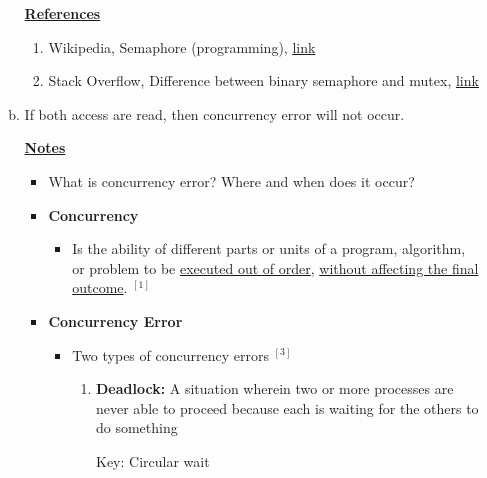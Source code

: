 \documentclass[12pt]{article}
\begin{document}
\begin{enumerate}[1.]
\begin{enumerate}[a)]
        \underline{\textbf{References}}

        \begin{enumerate}[1)]
            \item Wikipedia, Semaphore (programming), \href{https://en.wikipedia.org/wiki/Semaphore_(programming)}{link}
            \item Stack Overflow, Difference between binary semaphore and mutex, \href{https://stackoverflow.com/questions/62814/difference-between-binary-semaphore-and-mutex}{link}
        \end{enumerate}

        \item

        If both access are read, then concurrency error will not occur.

        \bigskip

        \underline{\textbf{Notes}}

        \begin{itemize}
            \item What is concurrency error? Where and when does it occur?

            \item \textbf{Concurrency}

            \begin{itemize}
                \item Is the ability of different parts or units of a program, algorithm,
                or problem to be \underline{executed out of order}, \underline{without affecting the final
                outcome}. $^{[1]}$
            \end{itemize}

            \item \textbf{Concurrency Error}

            \begin{itemize}
                \item Two types of concurrency errors $^{[3]}$

                \begin{enumerate}[1.]
                    \item \textbf{Deadlock:} A situation wherein two or more processes
                    are never able to proceed because each is waiting for the others
                    to do something

                    \bigskip

                    Key: Circular wait


\end{enumerate}
\end{itemize}
\end{itemize}
\end{enumerate}
\end{enumerate}
\end{document}
